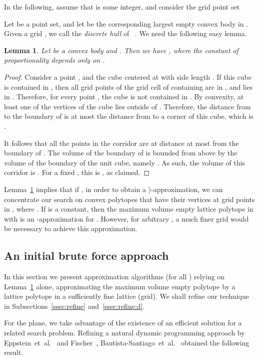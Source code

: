 \documentclass[11pt]{article}
\newtheorem{lemma}{Lemma}
\def\etal{{et~al.}}
\newcommand{\lemlab}[1]{\label{lemma:#1}}
\newcommand{\lemref}[1]{Lemma~\ref{lemma:#1}}
\begin{document}
In the following, assume that  is some integer, and consider the
grid point set

Let  be a point set, and let  be
the corresponding largest empty convex body in .
Given a grid , we call 
the \emph{discrete hull} of ~\cite{hp-osafd-98a}.
We need the following easy lemma.

\begin{lemma}\lemlab{discrete:hull}\label{discrete:hull}
    Let  be a convex body and .  Then we have , where
    the constant of proportionality depends only on .
\end{lemma}
\begin{proof}
    Consider a point , and the cube 
    centered at  with side length . If this cube is contained
    in , then all grid points of the grid cell of  containing
     are in , and  lies in . Therefore, for every
    point , the cube  is not contained
    in . By convexity, at least one of the vertices of the cube
     lies outside of . Therefore, the distance
    from  to the boundary of  is at most the distance from  to
    a corner of this cube, which is .

    It follows that all the points in the corridor  are
    at distance at most  from the boundary of . The volume
    of the boundary of  is bounded from above by the volume of the boundary of
    the unit cube, namely . As such, the volume of this corridor
    is .
    For a fixed , this is , as claimed.
\end{proof}

\lemref{discrete:hull} implies that if ,
in order to obtain a )-approximation,
we can concentrate our search on convex polytopes that have their
vertices at grid points in , where .
If  is a constant, then the maximum volume empty lattice
polytope in  with  is an -approximation
for . However, for arbitrary ,
a much finer grid would be necessary to achieve this approximation.


\subsection{An initial brute force approach}

In this section we present approximation algorithms (for all ) relying on
\lemref{discrete:hull} alone, approximating the maximum volume empty
polytope by a lattice polytope in a sufficiently fine lattice (grid).
We shall refine our technique in Subsections~\ref{ssec:refine}
and~\ref{ssec:refine:d}.

For the plane, we take advantage of the existence of an efficient
solution for a related search problem. Refining a natural dynamic programming
approach by Eppstein~\etal~\cite{EORW92} and Fischer~\cite{Fis97},
Bautista-Santiago~\etal~\cite{BDL+11} obtained the following result.
\end{document}
